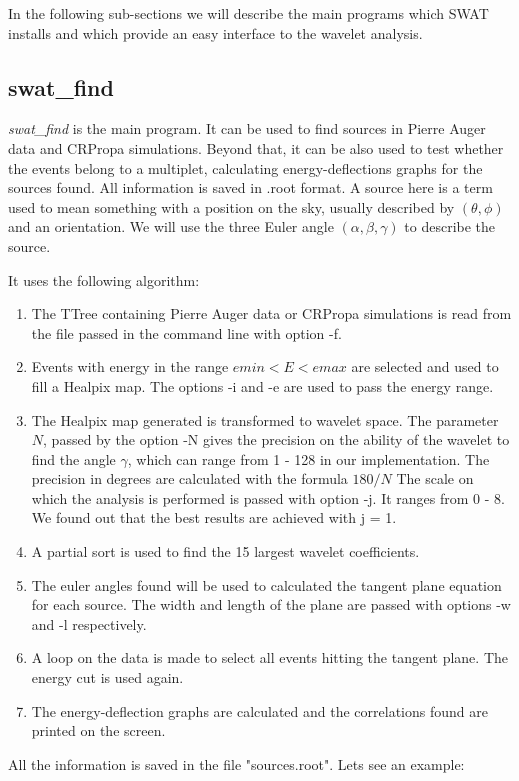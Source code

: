\documentclass[12pt]{article}
\begin{document}
In the following sub-sections we will describe the main programs which 
SWAT installs and which provide an easy interface to the wavelet analysis.

\subsection{swat\_find}

{\it swat\_find} is the main program. It can be used to find sources in Pierre
Auger data and CRPropa simulations. Beyond that, it can be also used to test
whether the events belong to a multiplet, calculating energy-deflections graphs
for the sources found. All information is saved in .root format. A source here
is a term used to mean something with a position on the sky, usually described
by $(\theta,\phi)$ and an orientation. We will use the three Euler angle
$(\alpha,\beta,\gamma)$ to describe the source. 

It uses the following algorithm:
\begin{enumerate}
\item The TTree containing Pierre Auger data or CRPropa simulations
is read from the file passed in the command line with option -f.
\item Events with energy in the range $emin < E < emax$ are selected and used
to fill a Healpix map.  The options -i and -e are used to pass the energy range.
\item The Healpix map generated is transformed to wavelet space. The parameter
$N$, passed by the option -N gives the precision on the ability of the wavelet
to find the angle $\gamma$, which can range from 1 - 128 in our implementation. 
The precision in degrees are calculated with the formula $180/N$ The scale on
which the analysis is performed is passed with option -j. It ranges from 0 - 8.
We found out that the best results are achieved with j = 1.
\item A partial sort is used to find the 15 largest wavelet coefficients.
\item The euler angles found will be used to calculated the tangent plane
equation for each source. The width and length of the plane are passed with
options -w and -l respectively.
\item A loop on the data is made to select all events hitting the tangent
plane. The energy cut is used again.
\item The energy-deflection graphs are calculated and the correlations found
are printed on the screen.
\end{enumerate}
All the information is saved in the file {\color{brown}"sources.root"}.  Lets see an example:
\end{document}
